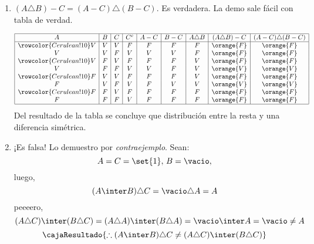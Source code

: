 \begin{enumerate}[label=\roman*)]
  \item $(A \triangle B) - C = (A-C) \triangle (B - C)$. Es verdadera.
        La demo sale fácil con tabla de verdad.

        $$
          \begin{array}{|c|c|c|c|c|c|c|c|c|}
            \hline
            A & B & C & C^c & A - C & B - C & A \triangle B & (A \triangle B) - C & (A - C) \triangle (B - C) \\\hline \rowcolor{Cerulean!10}
            V & V & V & F   & F     & F     & F             & \orange{F}          & \orange{F}                \\
            V & V & F & V   & V     & V     & F             & \orange{F}          & \orange{F}                \\\rowcolor{Cerulean!10}
            V & F & V & F   & F     & F     & V             & \orange{F}          & \orange{F}                \\
            V & F & F & V   & V     & F     & V             & \orange{V}          & \orange{V}                \\\rowcolor{Cerulean!10}
            F & V & V & F   & F     & F     & V             & \orange{F}          & \orange{F}                \\
            F & V & F & V   & F     & V     & V             & \orange{V}          & \orange{V}                \\\rowcolor{Cerulean!10}
            F & F & V & F   & F     & F     & F             & \orange{F}          & \orange{F}                \\
            F & F & F & V   & F     & F     & F             & \orange{F}          & \orange{F}                \\ \hline
          \end{array}
        $$
        Del resultado de la tabla se concluye que distribución entre la resta y una diferencia simétrica.

  \item ¡Es falsa!
        Lo demuestro por \textit{contraejemplo}.
        Sean:
        $$
          A = C = \set{1},\, B = \vacio,
        $$
        luego,
        $$
          (A \inter B) \triangle C = \vacio \triangle A = A
        $$
        peeeero,
        $$
          (A \triangle C) \inter (B \triangle C) =
          (A \triangle A) \inter (B \triangle A) =
          \vacio \inter A = \vacio \neq A
        $$
        $$
          \cajaResultado{
            \therefore (A \inter B) \triangle C \neq (A \triangle C) \inter (B \triangle C)
          }
        $$


\end{enumerate}
